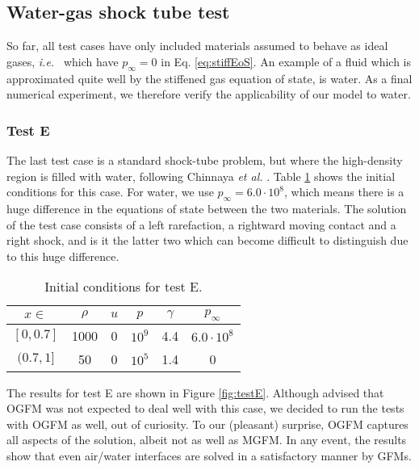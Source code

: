 \documentclass[final,3p,twocolumn]{elsarticle}
\begin{document}
\subsection{Water-gas shock tube test}
\label{subsec:water}

So far, all test cases have only included materials assumed to behave as ideal
gases, {\em i.e.~} which have $p_{\infty}=0$ in  Eq. \eqref{eq:stiffEoS}. An
example of a fluid which is approximated quite well by the stiffened gas
equation of state, is water. As a final numerical experiment, we therefore
verify the applicability of our model to water. 

\subsubsection{Test E}

The last test case is a standard shock-tube problem, but where the high-density
region is filled with water, following Chinnaya {\em et al.}
\cite{chinnayya2004modelling}. Table \ref{tab:testE} shows the initial
conditions for this case. For water, we use $p_{\infty} = 6.0 \cdot 10^8$,
which means there is a huge difference in the equations of state between the
two materials. The solution of the test case consists of a left rarefaction, a
rightward moving contact and a right shock, and is it the latter two which can
become difficult to distinguish due to this huge difference. 

\begin{table}[htb]
    \centering
    \begin{tabular}{cccccc}
        \hline
        $x \in $ & $\rho$ & $u$ & $p$ & $\gamma$ & $p_{\infty}$ \\
        \hline
        $[0,0.7]$ & 1000 & 0 & $10^9$ & 4.4 & $6.0\cdot 10^8$ \\
        $(0.7,1]$ & 50 & 0 & $10^5$ & 1.4 & 0 \\
        \hline
    \end{tabular}
    \caption{Initial conditions for test E.}
    \label{tab:testE}
\end{table}

The results for test E are shown in Figure \ref{fig:testE}. Although advised
that OGFM was not expected to deal well with this case, we decided to run the
tests with OGFM as well, out of curiosity. To our (pleasant) surprise, OGFM
captures all aspects of the solution, albeit not as well as MGFM. In any event,
the results show that even air/water interfaces are solved in a satisfactory
manner by GFMs. 
\end{document}
